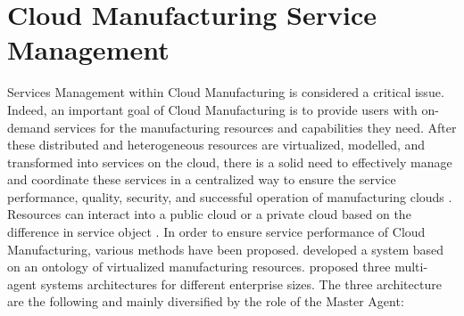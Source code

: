 \section{Cloud Manufacturing Service Management}
\label{chapter2-sec5}
Services Management within Cloud Manufacturing is considered a critical issue. Indeed, an important goal of Cloud Manufacturing is to provide users with on-demand services for the manufacturing resources and capabilities they need. After these distributed and heterogeneous resources are virtualized, modelled, and transformed into services on the cloud, there is a solid need to effectively manage and coordinate these services in a centralized way to ensure the service performance, quality, security, and successful operation of manufacturing clouds \parencite{he_state---art_2015}. Resources can interact into a public cloud or a private cloud based on the difference in service object \parencite{zhang_cloud_2014}. In order to ensure service performance of Cloud Manufacturing, various methods have been proposed. \textcite{model_information_2012} developed a system based on an ontology of virtualized manufacturing resources. \textcite{liu_resource_2011} proposed three multi-agent systems architectures for different enterprise sizes. The three architecture are the following and mainly diversified by the role of the Master Agent:

